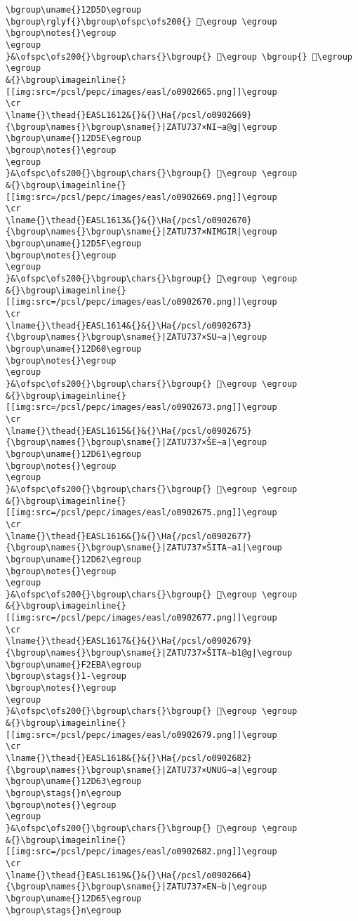 \begin{verbatim}
\bgroup\uname{}12D5D\egroup
\bgroup\rglyf{}\bgroup\ofspc\ofs200{} 𒵝\egroup \egroup
\bgroup\notes{}\egroup
\egroup
}&\ofspc\ofs200{}\bgroup\chars{}\bgroup{} 𒵝\egroup \bgroup{} 𒵦\egroup \egroup
&{}\bgroup\imageinline{}[[img:src=/pcsl/pepc/images/easl/o0902665.png]]\egroup
\cr
\lname{}\thead{}EASL1612&{}&{}\Ha{/pcsl/o0902669}{\bgroup\names{}\bgroup\sname{}|ZATU737×NI∼a@g|\egroup
\bgroup\uname{}12D5E\egroup
\bgroup\notes{}\egroup
\egroup
}&\ofspc\ofs200{}\bgroup\chars{}\bgroup{} 𒵞\egroup \egroup
&{}\bgroup\imageinline{}[[img:src=/pcsl/pepc/images/easl/o0902669.png]]\egroup
\cr
\lname{}\thead{}EASL1613&{}&{}\Ha{/pcsl/o0902670}{\bgroup\names{}\bgroup\sname{}|ZATU737×NIMGIR|\egroup
\bgroup\uname{}12D5F\egroup
\bgroup\notes{}\egroup
\egroup
}&\ofspc\ofs200{}\bgroup\chars{}\bgroup{} 𒵟\egroup \egroup
&{}\bgroup\imageinline{}[[img:src=/pcsl/pepc/images/easl/o0902670.png]]\egroup
\cr
\lname{}\thead{}EASL1614&{}&{}\Ha{/pcsl/o0902673}{\bgroup\names{}\bgroup\sname{}|ZATU737×SU∼a|\egroup
\bgroup\uname{}12D60\egroup
\bgroup\notes{}\egroup
\egroup
}&\ofspc\ofs200{}\bgroup\chars{}\bgroup{} 𒵠\egroup \egroup
&{}\bgroup\imageinline{}[[img:src=/pcsl/pepc/images/easl/o0902673.png]]\egroup
\cr
\lname{}\thead{}EASL1615&{}&{}\Ha{/pcsl/o0902675}{\bgroup\names{}\bgroup\sname{}|ZATU737×ŠE∼a|\egroup
\bgroup\uname{}12D61\egroup
\bgroup\notes{}\egroup
\egroup
}&\ofspc\ofs200{}\bgroup\chars{}\bgroup{} 𒵡\egroup \egroup
&{}\bgroup\imageinline{}[[img:src=/pcsl/pepc/images/easl/o0902675.png]]\egroup
\cr
\lname{}\thead{}EASL1616&{}&{}\Ha{/pcsl/o0902677}{\bgroup\names{}\bgroup\sname{}|ZATU737×ŠITA∼a1|\egroup
\bgroup\uname{}12D62\egroup
\bgroup\notes{}\egroup
\egroup
}&\ofspc\ofs200{}\bgroup\chars{}\bgroup{} 𒵢\egroup \egroup
&{}\bgroup\imageinline{}[[img:src=/pcsl/pepc/images/easl/o0902677.png]]\egroup
\cr
\lname{}\thead{}EASL1617&{}&{}\Ha{/pcsl/o0902679}{\bgroup\names{}\bgroup\sname{}|ZATU737×ŠITA∼b1@g|\egroup
\bgroup\uname{}F2EBA\egroup
\bgroup\stags{}1-\egroup
\bgroup\notes{}\egroup
\egroup
}&\ofspc\ofs200{}\bgroup\chars{}\bgroup{} 󲺺\egroup \egroup
&{}\bgroup\imageinline{}[[img:src=/pcsl/pepc/images/easl/o0902679.png]]\egroup
\cr
\lname{}\thead{}EASL1618&{}&{}\Ha{/pcsl/o0902682}{\bgroup\names{}\bgroup\sname{}|ZATU737×UNUG∼a|\egroup
\bgroup\uname{}12D63\egroup
\bgroup\stags{}n\egroup
\bgroup\notes{}\egroup
\egroup
}&\ofspc\ofs200{}\bgroup\chars{}\bgroup{} 𒵣\egroup \egroup
&{}\bgroup\imageinline{}[[img:src=/pcsl/pepc/images/easl/o0902682.png]]\egroup
\cr
\lname{}\thead{}EASL1619&{}&{}\Ha{/pcsl/o0902664}{\bgroup\names{}\bgroup\sname{}|ZATU737×EN∼b|\egroup
\bgroup\uname{}12D65\egroup
\bgroup\stags{}n\egroup

\end{verbatim}
